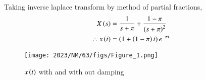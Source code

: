 \documentclass[journal,12pt,twocolumn]{IEEEtran}
\theoremstyle{remark}
\begin{document}
Taking inverse laplace transform by method of partial fractions,
\begin{align}
X\left(s\right) &= \frac{1}{s+\pi} + \frac{1-\pi}{\left(s+\pi\right)^2}\\
\therefore x\left(t\right) &= \left(1+ \left(1-\pi\right)t\right)e^{-\pi t}
\end{align}
\begin{figure}[h!]
    \texttt{[image: 2023/NM/63/figs/Figure\_1.png]}
    \caption{$ x\left(t\right)$ with and with out damping }
    \centering
    \label{fig: nm_63_fig_3}
\end{figure}
\end{document}
